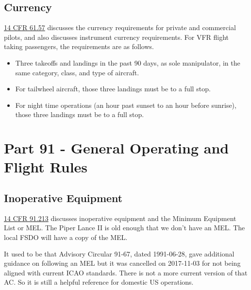 \subsection{Currency}

\href{https://www.ecfr.gov/current/title-14/chapter-I/subchapter-D/part-61/subpart-A/section-61.57}{14 CFR 61.57} discusses the currency requirements for private and commercial pilots, and also discusses instrument currency requirements. For VFR flight taking passengers, the requirements are as follows.

\begin{itemize}
\item Three takeoffs and landings in the past 90 days, as sole manipulator, in the same category, class, and type of aircraft.
\item For tailwheel aircraft, those three landings must be to a full stop.
\item For night time operations (an hour past sunset to an hour before sunrise), those three landings must be to a full stop.

\end{itemize}

\section{Part 91 - General Operating and Flight Rules}

\subsection{Inoperative Equipment}

\href{https://www.ecfr.gov/current/title-14/chapter-I/subchapter-F/part-91/subpart-C/section-91.213}{14 CFR 91.213} discusses inoperative equipment and the Minimum Equipment List or MEL. The Piper Lance II is old enough that we don't have an MEL. The local FSDO will have a copy of the MEL.

It used to be that Advisory Circular 91-67, dated 1991-06-28, gave additional guidance on following an MEL but it was cancelled on 2017-11-03 for not being aligned with current ICAO standards. There is not a more current version of that AC. So it is still a helpful reference for domestic US operations.








